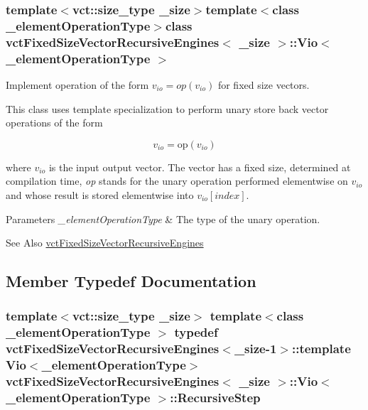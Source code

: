 \subsubsection*{template$<$vct\-::size\-\_\-type \-\_\-size$>$template$<$class \-\_\-element\-Operation\-Type$>$class vct\-Fixed\-Size\-Vector\-Recursive\-Engines$<$ \-\_\-size $>$\-::\-Vio$<$ \-\_\-element\-Operation\-Type $>$}

Implement operation of the form $v_{io} = op(v_{io})$ for fixed size vectors. 

This class uses template specialization to perform unary store back vector operations of the form

\[ v_{io} = \mathrm{op}(v_{io}) \]

where $v_{io}$ is the input output vector. The vector has a fixed size, determined at compilation time, {\itshape op} stands for the unary operation performed elementwise on $v_{io}$ and whose result is stored elementwise into $v_{io}[index]$.


\begin{DoxyParams}{Parameters}
{\em \-\_\-element\-Operation\-Type} & The type of the unary operation.\\
\hline
\end{DoxyParams}
\begin{DoxySeeAlso}{See Also}
\hyperlink{classvct_fixed_size_vector_recursive_engines}{vct\-Fixed\-Size\-Vector\-Recursive\-Engines} 
\end{DoxySeeAlso}


\subsection{Member Typedef Documentation}
\hypertarget{classvct_fixed_size_vector_recursive_engines_1_1_vio_ab8636d835afe64d6831799cc7ce45d27}{
\subsubsection[{Recursive\-Step}]{\setlength{\rightskip}{0pt plus 5cm}template$<$vct\-::size\-\_\-type \-\_\-size$>$ template$<$class \-\_\-element\-Operation\-Type $>$ typedef {\bf vct\-Fixed\-Size\-Vector\-Recursive\-Engines}$<$\-\_\-size-\/1$>$\-::template {\bf Vio}$<$\-\_\-element\-Operation\-Type$>$ {\bf vct\-Fixed\-Size\-Vector\-Recursive\-Engines}$<$ \-\_\-size $>$\-::{\bf Vio}$<$ \-\_\-element\-Operation\-Type $>$\-::{\bf Recursive\-Step}}}\label{classvct_fixed_size_vector_recursive_engines_1_1_vio_ab8636d835afe64d6831799cc7ce45d27}


